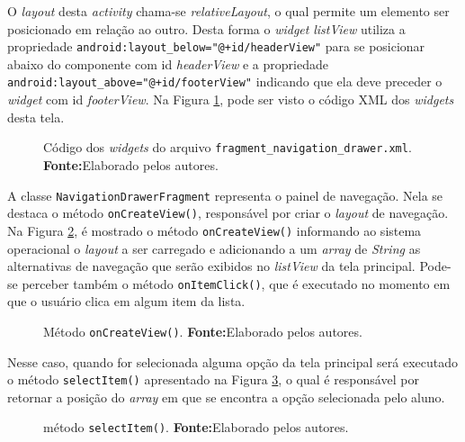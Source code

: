 	\par O \textit{layout} desta \textit{activity} chama-se
\textit{relativeLayout}, o qual permite um elemento ser posicionado em relação
ao outro. Desta forma o \textit{widget} \textit{listView} utiliza a propriedade
\texttt{android:layout\_below="@+id/headerView"} para se posicionar abaixo do
componente com id \textit{headerView} e a propriedade
\texttt{android:layout\_above="@+id/footerView"} indicando que ela deve preceder
o \textit{widget} com id \textit{footerView}. Na Figura \ref{fig:app2}, pode
ser visto o código XML dos \textit{widgets} desta tela.

	\begin{figure}[h!] 
		
		\caption[Código dos widgets do arquivo
		fragment\_navigation\_drawer.xml]{Código dos \textit{widgets} do arquivo
		\texttt{fragment\_navigation\_drawer.xml}.
		\textbf{Fonte:}Elaborado pelos autores.}
		\label{fig:app2}
	\end{figure}
	
	\pagebreak
	
	\par A classe \texttt{NavigationDrawerFragment} representa o painel de
navegação. Nela se destaca o método \texttt{onCreateView()}, responsável por
criar o \textit{layout} de navegação. Na Figura \ref{fig:app3}, é mostrado o
método \texttt{onCreateView()} informando ao sistema operacional o \textit{layout} a
ser carregado e adicionando a um \textit{array} de \textit{String} as
alternativas de navegação que serão exibidos no \textit{listView} da tela
principal. Pode-se perceber também o método \texttt{onItemClick()}, que é
executado no momento em que o usuário clica em algum item da lista. 
	


	\begin{figure}[h!] 
		
		\caption[Método onCreateView()]{Método \texttt{onCreateView()}.
		\textbf{Fonte:}Elaborado pelos autores.}
		\label{fig:app3}
	\end{figure}
	
	\pagebreak
	
	\par Nesse caso, quando for selecionada alguma opção da tela principal será
executado o método \texttt{selectItem()} apresentado na Figura \ref{fig:app4}, o
qual é responsável por retornar a posição do \textit{array} em que se encontra a
opção selecionada pelo aluno.
	
	\begin{figure}[h!] 
		
		\caption[método selectItem()]{método \texttt{selectItem()}.
		\textbf{Fonte:}Elaborado pelos autores.}
		\label{fig:app4}
	\end{figure}
	
